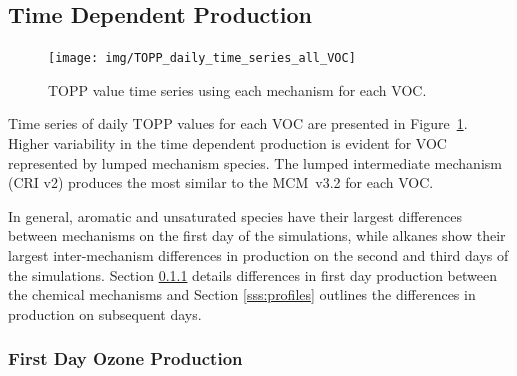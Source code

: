 \subsection[Time Dependent Ox Production]{Time Dependent  Production}

\begin{figure}
    \centering
    \texttt{[image: img/TOPP\_daily\_time\_series\_all\_VOC]}
    \vspace{0mm}
    \caption{TOPP value time series using each mechanism for each VOC.}
    \vspace{-4mm}
    \label{f:TOPP_dailies}
\end{figure}

Time series of daily TOPP values for each VOC are presented in \mbox{Figure \ref{f:TOPP_dailies}}. 
Higher variability in the time dependent  production is evident for VOC represented by lumped mechanism species.
The lumped intermediate mechanism (CRI v2) produces the most similar  to the \mbox{MCM v3.2} for each VOC.

In general, aromatic and unsaturated species have their largest differences between mechanisms on the first day of the simulations, while alkanes show their largest inter-mechanism differences in  production on the second and third days of the simulations.
Section \ref{sss:day1} details differences in first day  production between the chemical mechanisms and Section \ref{sss:profiles} outlines the differences in  production on subsequent days.

\subsubsection{First Day Ozone Production} \label{sss:day1} %

